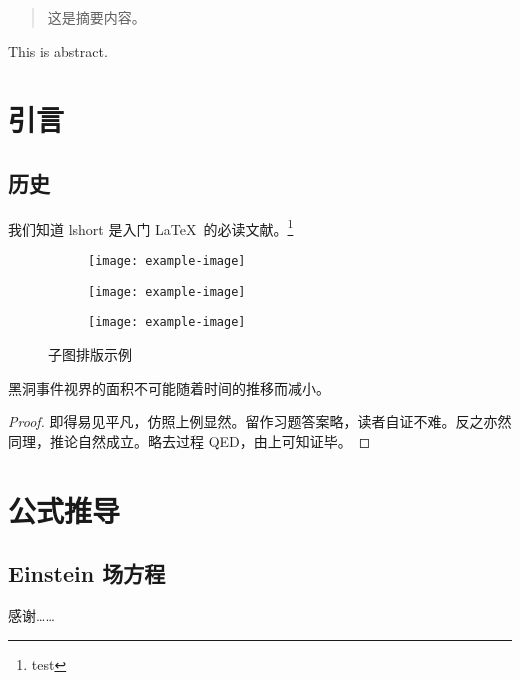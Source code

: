 \documentclass[bachelor,ncu,newenv]{ncuthesis}
\begin{document}
\maketitle
\frontmatter
\makedecaut
\begin{abstract}
这是摘要内容。
\end{abstract}
\begin{abstract*}
This is abstract.
\end{abstract*}
\tableofcontents
\mainmatter
\chapter{引言}
\section{历史}
我们知道 lshort\cite{lshortcn} 是入门 \LaTeX\ 的必读文献。\footnote{test}

\begin{figure}[htb]
\centering
\begin{subfigure}{.45\textwidth}
\centering
\texttt{[image: example-image]}
\label{fig:subfigexp-a}
\end{subfigure}
\begin{subfigure}{.45\textwidth}
\centering
\texttt{[image: example-image]}
\label{fig:subfigexp-b}
\end{subfigure}
\begin{subfigure}{.45\textwidth}
\centering
\texttt{[image: example-image]}
\label{fig:subfigexp-c}
\end{subfigure}
\caption{子图排版示例}
\label{fig:subfig}
\end{figure}

\begin{law}[黑洞面积定律]
黑洞事件视界的面积不可能随着时间的推移而减小。
\end{law}
\begin{proof}
即得易见平凡，仿照上例显然。留作习题答案略，读者自证不难。反之亦然同理，推论自然成立。略去过程 QED，由上可知证毕。
\end{proof}
\appendix
\chapter{公式推导}
\section{Einstein 场方程}
\backmatter

\begin{acknowledgements}
感谢……
\end{acknowledgements}
\end{document}
